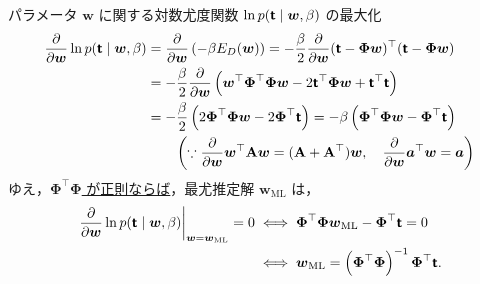 \documentclass[uplatex,11pt,dvipdfmx,aspectratio=169,unicode,t]{beamer}
\numberwithin{equation}{section}
\newcommand{\mb}[1]{\mathbf{#1}}
\newcommand{\tb}[1]{\textbf{#1}}
\newcommand{\ts}[1]{\textsf{#1}}
\newcommand{\bs}[1]{\boldsymbol{#1}}
\newcommand{\1}{\bs{1}}
\newcommand{\0}{\bs{0}}
\begin{document}
\begin{frame}{パラメータ $\bs{w}$ に関する対数尤度関数 $\ln p(\tb{\ts{t}} \mid \bs{w},\beta)$ の最大化}
    \vspace{-22pt}
    \begin{align}
        \frac{\partial}{\partial{\bs{w}}} \ln p(\tb{\ts{t}} \mid \bs{w},\beta) &= \frac{\partial}{\partial{\bs{w}}} \left(-\beta E_{D}(\bs{w})\right) = - \frac{\beta}{2} \frac{\partial}{\partial{\bs{w}}} (\tb{\ts{t}} - \bs{\Phi}\bs{w})^{\top} (\tb{\ts{t}} - \bs{\Phi}\bs{w}) \\
        &= -\frac{\beta}{2} \frac{\partial}{\partial{\bs{w}}} \left(\bs{w}^{\top} \bs{\Phi}^{\top} \bs{\Phi} \bs{w} - 2 \tb{\ts{t}}^{\top} \bs{\Phi} \bs{w} + \tb{\ts{t}}^{\top} \tb{\ts{t}} \right) \\
        &= - \frac{\beta}{2} \left(2 \bs{\Phi}^{\top} \bs{\Phi} \bs{w} - 2 \bs{\Phi}^{\top} \tb{\ts{t}}\right) = - \beta \left(\bs{\Phi}^{\top} \bs{\Phi} \bs{w} - \bs{\Phi}^{\top} \tb{\ts{t}}\right) \\
        & \qquad \left(\because \frac{\partial}{\partial{\bs{w}}} \bs{w}^{\top} \mb{A} \bs{w} = (\mb{A} + \mb{A}^{\top}) \bs{w}, \quad \frac{\partial}{\partial{\bs{w}}} \bs{a}^{\top} \bs{w} = \bs{a} \right)
    \end{align}
    ゆえ，\underline{$\bs{\Phi}^{\top}\bs{\Phi}$ が正則ならば}，最尤推定解 $\bs{w}_{\text{ML}}$ は，
    \begin{align}
        \left.\frac{\partial}{\partial{\bs{w}}} \ln p(\tb{\ts{t}} \mid \bs{w},\beta)\right|_{\bs{w} = \bs{w}_{\text{ML}}} = 0 &\iff \bs{\Phi}^{\top} \bs{\Phi} \bs{w}_{\text{ML}} - \bs{\Phi}^{\top} \tb{\ts{t}} = 0 \label{eq:maximum likelihood} \\
        &\iff \bs{w}_{\text{ML}} = \left(\bs{\Phi}^{\top}\bs{\Phi}\right)^{-1} \bs{\Phi}^{\top} \tb{\ts{t}}. \label{eq:normal equation}
    \end{align}
\end{frame}
\end{document}

